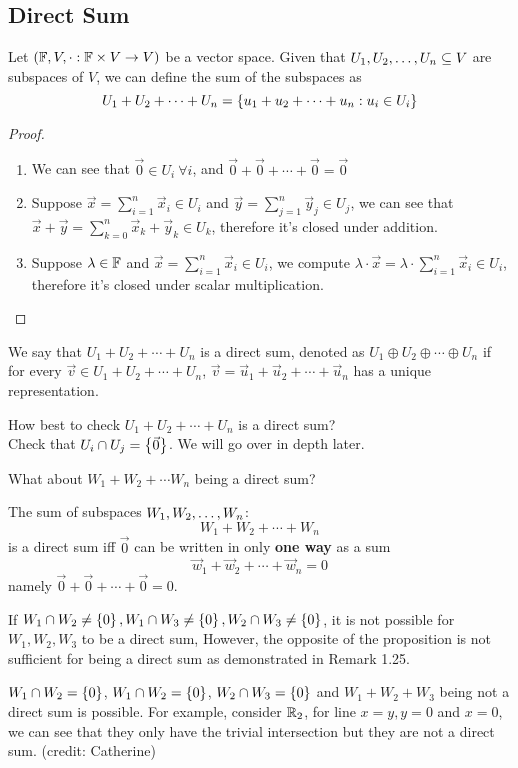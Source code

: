 \subsection{Direct Sum}
\begin{definition}
    Let $(\mathbb F, V, \cdot : \mathbb F \times V \to V)$ be a vector space. Given that ${U}_1,{U}_2, \ldots, {U}_{n} \subseteq V$ are subspaces of $V$, we can define the sum of the subspaces as 
    \[ U_1 + U_2 + \cdots + U_n = \left\{ u_1 + u_2 + \cdots + u_n : u_i \in U_i \right\} \]
\end{definition}
\begin{proof}
    \begin{enumerate} [label  = \arabic*)]
        \item We can see that $\vec 0 \in U_i \ \forall i$, and $\vec 0 + \vec 0 + \cdots + \vec 0 = \vec 0$
        \item Suppose $\vec x = \sum_{i = 1}^n \vec x_i \in U_i$ and $\vec  y = \sum_{j = 1}^n \vec y_j \in U_j$, we can see that $\vec x + \vec y = \sum_{k = 0}^n \vec x_k + \vec y_k \in U_k$, therefore it's closed under addition.
        \item Suppose $\lambda \in \mathbb F$ and $\vec x = \sum_{i = 1}^n \vec x_i \in U_i$, we compute $\lambda \cdot \vec x = \lambda \cdot \sum_{i = 1}^n \vec x_i \in U_i$, therefore it's closed under scalar multiplication.
    \end{enumerate}
\end{proof}
\begin{definition}
    We say that $U_1 + U_2 + \cdots + U_n$ is a direct sum, denoted as $U_1 \oplus U_2 \oplus \cdots \oplus U_n$ if for every $\vec v \in U_1 + U_2 + \cdots + U_n$, $\vec v = \vec u_1 + \vec u_2 + \cdots + \vec u_n$ has a unique representation. 
\end{definition} 
\begin{remark}
    How best to check $U_1 + U_2 + \cdots + U_n$ is a direct sum? \\
    Check that $U_i \cap U_j = \left\{ \vec 0 \right\}$. We will go over in depth later.
\end{remark}
What about $W_1 + W_2 + \cdots W_n$ being a direct sum?
\begin{theorem}
    The sum of subspaces ${W}_1,{W}_2, \ldots, {W}_{n}$: 
    \[W_1 + W_2 + \cdots + W_n\]
    is a direct sum iff $\vec 0$ can be written in only \textbf{one way} as a sum 
    \[ \vec w_1 + \vec w_2 + \cdots + \vec w_n = 0\]
    namely $\vec 0 + \vec 0 + \cdots + \vec 0 = 0$.
\end{theorem}
\begin{remark}
    If $W_1 \cap W_2 \neq \left\{ 0 \right\}, W_1 \cap W_3 \neq \left\{ 0 \right\}, W_2 \cap W_3 \neq \left\{ 0 \right\}$, it is not possible for $W_1,W_2,W_3$ to be a direct sum, However, the opposite of the proposition is not sufficient for being a direct sum as demonstrated in Remark 1.25.
\end{remark}
\begin{remark}
    $W_1 \cap W_2 = \left\{ 0 \right\}$, $W_1 \cap W_2 = \left\{ 0 \right\}$, $W_2 \cap W_3 = \left\{ 0 \right\}$ and $W_1 + W_2 + W_3$ being not a direct sum is possible. For example, consider $\mathbb R_2$, for line $x = y, y = 0$ and $x = 0$, we can see that they only have the trivial intersection but they are not a direct sum. (credit: Catherine)
\end{remark}
\newpage 